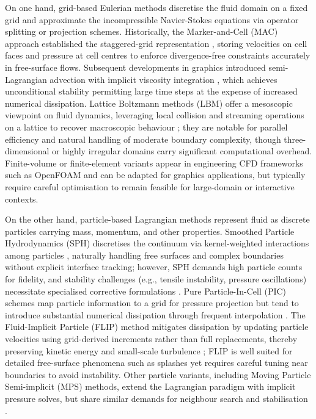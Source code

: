 On one hand, grid-based Eulerian methods discretise the fluid domain on a fixed grid and approximate the incompressible Navier-Stokes equations via operator splitting or projection schemes. Historically, the Marker-and-Cell (MAC) approach established the staggered-grid representation \cite{Harlow1965}, storing velocities on cell faces and pressure at cell centres to enforce divergence-free constraints accurately in free-surface flows. Subsequent developments in graphics introduced semi-Lagrangian advection with implicit viscosity integration \cite{Stam1999}, which achieves unconditional stability permitting large time steps at the expense of increased numerical dissipation. Lattice Boltzmann methods (LBM) offer a mesoscopic viewpoint on fluid dynamics, leveraging local collision and streaming operations on a lattice to recover macroscopic behaviour \cite{Chen1998}; they are notable for parallel efficiency and natural handling of moderate boundary complexity, though three-dimensional or highly irregular domains carry significant computational overhead. Finite-volume or finite-element variants appear in engineering CFD frameworks such as OpenFOAM and can be adapted for graphics applications, but typically require careful optimisation to remain feasible for large-domain or interactive contexts. %

On the other hand, particle-based Lagrangian methods represent fluid as discrete particles carrying mass, momentum, and other properties. Smoothed Particle Hydrodynamics (SPH) discretises the continuum via kernel-weighted interactions among particles \cite{Monaghan2005}, naturally handling free surfaces and complex boundaries without explicit interface tracking; however, SPH demands high particle counts for fidelity, and stability challenges (e.g., tensile instability, pressure oscillations) necessitate specialised corrective formulations \cite{Monaghan2005,Koschier2022}. Pure Particle-In-Cell (PIC) schemes map particle information to a grid for pressure projection but tend to introduce substantial numerical dissipation through frequent interpolation \cite{Harlow1962}. The Fluid-Implicit Particle (FLIP) method mitigates dissipation by updating particle velocities using grid-derived increments rather than full replacements, thereby preserving kinetic energy and small-scale turbulence \cite{Brackbill1988}; FLIP is well suited for detailed free-surface phenomena such as splashes yet requires careful tuning near boundaries to avoid instability. Other particle variants, including Moving Particle Semi-implicit (MPS) methods, extend the Lagrangian paradigm with implicit pressure solves, but share similar demands for neighbour search and stabilisation \cite{Koshizuka1996}.

